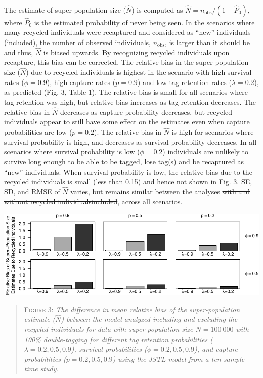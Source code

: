 \documentclass[12pt]{article}
\providecommand{\DIFaddtex}[1]{{\protect\color{blue}\uwave{#1}}} %
\providecommand{\DIFdeltex}[1]{{\protect\color{red}\sout{#1}}}                      %
\providecommand{\DIFaddbegin}{} %
\providecommand{\DIFaddend}{} %
\providecommand{\DIFdelbegin}{} %
\providecommand{\DIFdelend}{} %
\providecommand{\DIFadd}[1]{\texorpdfstring{\DIFaddtex{#1}}{#1}} %
\providecommand{\DIFdel}[1]{\texorpdfstring{\DIFdeltex{#1}}{}} %
\newcommand{\DIFscaledelfig}{0.5}
\newlength{\DIFdelgraphicswidth} %
\newlength{\DIFdelgraphicsheight} %
\newcommand{\DIFaddincludegraphics}[2][]{{\color{blue}\fbox{\DIFOincludegraphics[#1]{#2}}}} %
\newcommand{\DIFdelincludegraphics}[2][]{%
\sbox{\DIFdelgraphicsbox}{\DIFOincludegraphics[#1]{#2}}%
\settoboxwidth{\DIFdelgraphicswidth}{\DIFdelgraphicsbox} %
\settoboxtotalheight{\DIFdelgraphicsheight}{\DIFdelgraphicsbox} %
\scalebox{\DIFscaledelfig}{%
\parbox[b]{\DIFdelgraphicswidth}{\usebox{\DIFdelgraphicsbox}\\[-\baselineskip] \rule{\DIFdelgraphicswidth}{0em}}\llap{\resizebox{\DIFdelgraphicswidth}{\DIFdelgraphicsheight}{%
\setlength{\unitlength}{\DIFdelgraphicswidth}%
\begin{picture}(1,1)%
\thicklines\linethickness{2pt} %
{\color[rgb]{1,0,0}\put(0,0){\framebox(1,1){}}}%
{\color[rgb]{1,0,0}\put(0,0){\line( 1,1){1}}}%
{\color[rgb]{1,0,0}\put(0,1){\line(1,-1){1}}}%
\end{picture}%
}\hspace*{3pt}}} %
} %
\DeclareRobustCommand{\DIFaddbegin}{\DIFOaddbegin \let\includegraphics\DIFaddincludegraphics} %
\DeclareRobustCommand{\DIFaddend}{\DIFOaddend \let\includegraphics\DIFOincludegraphics} %
\DeclareRobustCommand{\DIFdelbegin}{\DIFOdelbegin \let\includegraphics\DIFdelincludegraphics} %
\DeclareRobustCommand{\DIFdelend}{\DIFOaddend \let\includegraphics\DIFOincludegraphics} %
\begin{document}
~ ~

The estimate of super-population size (\(\hat{N}\)) is computed as
\(\hat{N}=n_{\text{obs}}/{(1-\hat{P}_0)}\), where \(\hat{P}_0\) is the
estimated probability of never being seen. In the scenarios where many
recycled individuals were recaptured and considered as ``new''
individuals (included), the number of observed individuals, \(n_{\text{obs}}\), is larger than it should  be and thus,
\(\hat{N}\) is biased upwards. By recognizing recycled individuals upon recapture, this bias can be corrected. The relative bias in the
super-population size (\(\hat{N}\)) due to recycled individuals is 
highest in the scenario with high survival rates (\(\phi=0.9\)), high
capture rates (\(p=0.9\)) and low tag retention rates (\(\lambda=0.2\)),
as predicted (Fig. 3, Table 1). The relative bias is small for all
scenarios where tag retention was high, but relative bias increases as
tag retention decreases. The relative bias in \(\hat{N}\) decreases as
capture probability decreases, but recycled individuals appear to still
have some effect on the estimates even when capture probabilities
are low (\(p=0.2\)). The relative bias in \(\hat{N}\) is high for
scenarios where survival probability is high, and decreases as
survival probability decreases. In all scenarios where survival probability is
low (\(\phi=0.2\)) individuals are unlikely to survive long enough to be
able to be tagged, lose tag(s) and be recaptured as  ``new''
individuals. When survival probability is low, the relative bias due to the recycled
individuals is small (less than 0.15) and hence not shown in Fig. 3.
SE, SD, and RMSE of \(\hat{N}\) varies, but remains similar between the
analyses \DIFdelbegin \DIFdel{with and without recycled individualsincluded}\DIFdelend \DIFaddbegin \DIFadd{including and excluding recycled individuals}\DIFaddend , across all
scenarios.

\includegraphics{RecycledPaper_files/figure-latex/Figure2_N-1.pdf}

\begin{quote}
\textsc{Figure 3:}
\textsl{The difference in mean relative bias of the super-population estimate ($\hat{N}$) between the model analyzed including and excluding the recycled individuals for data with super-population size $N=100\ 000$ with 100\% double-tagging for different tag retention probabilities ($\lambda=0.2,0.5,0.9$), survival probabilities ($\phi=0.2,0.5,0.9$), and capture probabilities ($p=0.2,0.5,0.9$) using the JSTL model from a ten-sample-time study.}
\end{quote}
\end{document}
